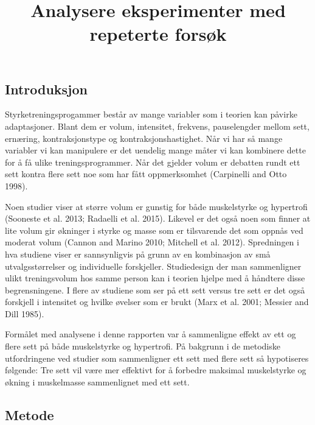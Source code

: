 \documentclass[
  letterpaper,
  DIV=11,
  numbers=noendperiod]{scrartcl}
\title{Analysere eksperimenter med repeterte forsøk}
\author{}
\date{}
\begin{document}
\maketitle
\ifdefined\Shaded\renewenvironment{Shaded}{\begin{tcolorbox}[borderline west={3pt}{0pt}{shadecolor}, breakable, sharp corners, interior hidden, boxrule=0pt, enhanced, frame hidden]}{\end{tcolorbox}}\fi

\hypertarget{introduksjon}{%
\subsection{Introduksjon}\label{introduksjon}}

Styrketreningsprogammer består av mange variabler som i teorien kan
påvirke adaptasjoner. Blant dem er volum, intensitet, frekvens,
pauselengder mellom sett, ernæring, kontraksjonstype og
kontraksjonshastighet. Når vi har så mange variabler vi kan manipulere
er det uendelig mange måter vi kan kombinere dette for å få ulike
treningsprogrammer. Når det gjelder volum er debatten rundt ett sett
kontra flere sett noe som har fått oppmerksomhet (Carpinelli and Otto
1998).

Noen studier viser at større volum er gunstig for både muskelstyrke og
hypertrofi (Sooneste et al. 2013; Radaelli et al. 2015). Likevel er det
også noen som finner at lite volum gir økninger i styrke og masse som er
tilsvarende det som oppnås ved moderat volum (Cannon and Marino 2010;
Mitchell et al. 2012). Spredningen i hva studiene viser er sannsynligvis
på grunn av en kombinasjon av små utvalgsstørrelser og individuelle
forskjeller. Studiedesign der man sammenligner ulikt treningsvolum hos
samme person kan i teorien hjelpe med å håndtere disse begrensningene. I
flere av studiene som ser på ett sett versus tre sett er det også
forskjell i intensitet og hvilke øvelser som er brukt (Marx et al. 2001;
Messier and Dill 1985).

Formålet med analysene i denne rapporten var å sammenligne effekt av ett
og flere sett på både muskelstyrke og hypertrofi. På bakgrunn i de
metodiske utfordringene ved studier som sammenligner ett sett med flere
sett så hypotiseres følgende: Tre sett vil være mer effektivt for å
forbedre maksimal muskelstyrke og økning i muskelmasse sammenlignet med
ett sett.

\hypertarget{metode}{%
\subsection{Metode}\label{metode}}
\end{document}
